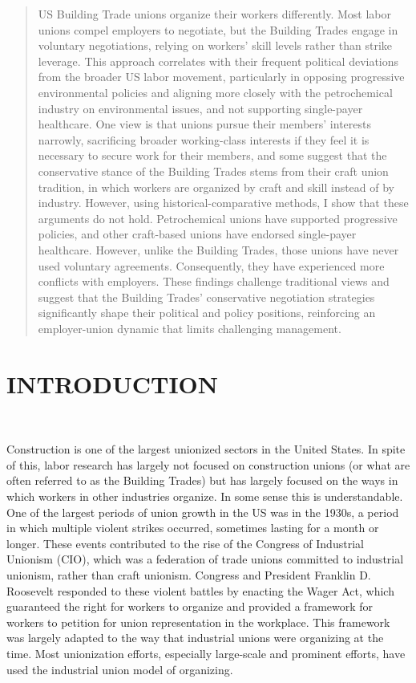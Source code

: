 \begin{abstract}
US Building Trade unions organize their workers differently. Most labor unions compel employers to negotiate, but the Building Trades engage in voluntary negotiations, relying on workers' skill levels rather than strike leverage. This approach correlates with their frequent political deviations from the broader US labor movement, particularly in opposing progressive environmental policies and aligning more closely with the petrochemical industry on environmental issues, and not supporting single-payer healthcare. One view is that unions pursue their members’ interests narrowly, sacrificing broader working-class interests if they feel it is necessary to secure work for their members, and some suggest that the conservative stance of the Building Trades stems from their craft union tradition, in which workers are organized by craft and skill instead of by industry. However, using historical-comparative methods, I show that these arguments do not hold. Petrochemical unions have supported progressive policies, and other craft-based unions have endorsed single-payer healthcare. However, unlike the Building Trades, those unions have never used voluntary agreements. Consequently, they have experienced more conflicts with employers. These findings challenge traditional views and suggest that the Building Trades' conservative negotiation strategies significantly shape their political and policy positions, reinforcing an employer-union dynamic that limits challenging management.
\end{abstract}
\newpage

\tableofcontents
\newpage


\section{INTRODUCTION} \

Construction is one of the largest unionized sectors in the United States. In spite of this, labor research has largely not focused on construction unions (or what are often referred to as the Building Trades) but has largely focused on the ways in which workers in other industries organize. In some sense this is understandable. One of the largest periods of union growth in the US was in the 1930s, a period in which multiple violent strikes occurred, sometimes lasting for a month or longer. These events contributed to the rise of the Congress of Industrial Unionism (CIO), which was a federation of trade unions committed to industrial unionism, rather than craft unionism. Congress and President Franklin D. Roosevelt responded to these violent battles by enacting the Wager Act, which guaranteed the right for workers to organize and provided a framework for workers to petition for union representation in the workplace. This framework was largely adapted to the way that industrial unions were organizing at the time. Most unionization efforts, especially large-scale and prominent efforts, have used the industrial union model of organizing.

